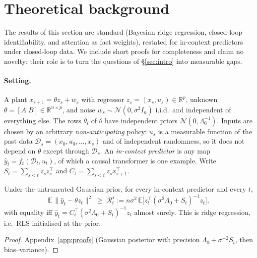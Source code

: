 \section{Theoretical background}\label{sec:theory}
The results of this section are standard (Bayesian ridge regression, closed-loop identifiability, and attention as
fast weights), restated for in-context predictors under closed-loop data. We include short proofs for completeness and
claim no novelty; their role is to turn the questions of \S\ref{sec:intro} into measurable gaps.

\paragraph{Setting.} A plant $x_{s+1}=\theta z_s+w_s$ with regressor $z_s=(x_s,u_s)\in\mathbb{R}^p$, unknown
$\theta=[A\;B]\in\mathbb{R}^{n\times p}$, and noise $w_s\sim\mathcal{N}(0,\sigma^2 I_n)$ i.i.d.\ and independent of
everything else. The rows $\theta_i$ of $\theta$ have independent priors $\mathcal{N}(0,\Lambda_0^{-1})$. Inputs are chosen by an
arbitrary \emph{non-anticipating} policy: $u_s$ is a measurable function of the past data
$\mathcal{D}_s=(x_0,u_0,\dots,x_s)$ and of independent randomness, so it does not depend on $\theta$ except through
$\mathcal{D}_s$. An \emph{in-context predictor} is any map $\hat y_t=f_t(\mathcal{D}_t,u_t)$, of which a causal transformer
is one example. Write $S_t=\sum_{s<t} z_s z_s^\top$ and $C_t=\sum_{s<t} z_s x_{s+1}^\top$.

\begin{theorem}\label{thm:bayes}
Under the untruncated Gaussian prior, for every in-context predictor and every $t$,
\begin{equation}
\mathbb{E}\,\|\hat y_t-\theta z_t\|^2\;\ge\;\mathcal{R}^\star_t:=n\sigma^2\,\mathbb{E}\big[z_t^\top(\sigma^2\Lambda_0+S_t)^{-1}z_t\big],
\label{eq:bayes}
\end{equation}
with equality iff $\hat y_t=C_t^\top(\sigma^2\Lambda_0+S_t)^{-1}z_t$ almost surely. This is ridge regression, i.e.\ RLS
initialised at the prior.
\end{theorem}
\begin{proof}
Appendix~\ref{app:proofs} (Gaussian posterior with precision $\Lambda_0+\sigma^{-2}S_t$, then bias--variance).
\end{proof}

